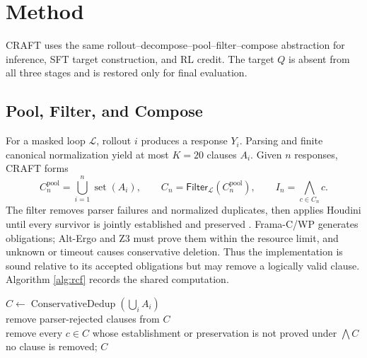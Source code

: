 \section{Method}\label{sec:method}

CRAFT uses the same rollout--decompose--pool--filter--compose abstraction for
inference, SFT target construction, and RL credit.  The target \(Q\) is absent
from all three stages and is restored only for final evaluation.

\subsection{Pool, Filter, and Compose}\label{sec:method:core}

For a masked loop \(\mathcal L\), rollout \(i\) produces a response \(Y_i\).
Parsing and finite canonical normalization yield at most \(K=20\) clauses
\(A_i\).  Given \(n\) responses, CRAFT forms
\[
 C_n^{\mathrm{pool}}=\bigcup_{i=1}^{n}\operatorname{set}(A_i),\qquad
 C_n=\mathsf{Filter}_{\mathcal L}(C_n^{\mathrm{pool}}),\qquad
 I_n=\bigwedge_{c\in C_n}c.
\]
The filter removes parser failures and normalized duplicates, then applies
Houdini until every survivor is jointly established and preserved
\citep{flanagan2001houdini}.  Frama-C/WP generates obligations; Alt-Ergo and
Z3 must prove them within the resource limit, and unknown or timeout causes
conservative deletion.  Thus the implementation is sound relative to its
accepted obligations but may remove a logically valid clause.  Algorithm
\ref{alg:rcf} records the shared computation.

\begin{algorithm}[H]
\caption{Rollout--decompose--pool--filter--compose}\label{alg:rcf}
\begin{algorithmic}
\algline \(C\leftarrow\operatorname{ConservativeDedup}(\bigcup_i A_i)\)\\
\algline remove parser-rejected clauses from \(C\)\\
\algline {} remove every \(c\in C\) whose establishment or
preservation is not proved under \(\bigwedge C\)\\
\algline {} no clause is removed;  \(C\)\\
\end{algorithmic}
\end{algorithm}

